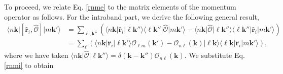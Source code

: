To proceed, we relate Eq. \eqref{rnme} to the matrix elements of the momentum
operator as follows. For the intraband part, we derive the following general
result,
\begin{equation}\label{conmri}
\begin{split}
\langle n\mathbf{k}\vert
\left[\hat{\mathbf{r}}_{i},\hat{\mathcal{O}}\right]
\vert m\mathbf{k}'\rangle
&= \sum_{\ell,\mathbf{k}''}
\left(
\langle n\mathbf{k}\vert\hat{\mathbf{r}}_{i}\vert\ell\mathbf{k}''\rangle
\langle\ell\mathbf{k}''\vert\hat{\mathcal{O}}\vert m\mathbf{k}'\rangle
-
\langle n\mathbf{k}\vert\hat{\mathcal{O}}\vert\ell\mathbf{k}''\rangle
\langle\ell\mathbf{k}''\vert\hat{\mathbf{r}}_{i}\vert m\mathbf{k}'\rangle
\right)\\
&=
\sum_{\ell}
\left(
\langle n\mathbf{k}\vert\hat{\mathbf{r}}_{i}\vert \ell\mathbf{k}'\rangle
\mathcal{O}_{\ell m}(\mathbf{k}')
-
\mathcal{O}_{n\ell}(\mathbf{k})
\vert \ell\mathbf{k}\rangle\langle \ell\mathbf{k}\vert\hat{\mathbf{r}}_{i}
\vert m\mathbf{k}'\rangle
\right),
\end{split}
\end{equation}
where we have taken $\langle
n\mathbf{k}\vert\hat{\mathcal{O}}\vert\ell\mathbf{k}''\rangle =
\delta(\mathbf{k} - \mathbf{k}'')\mathcal{O}_{n\ell}(\mathbf{k})$. We substitute
Eq. \eqref{rnmi} to obtain

